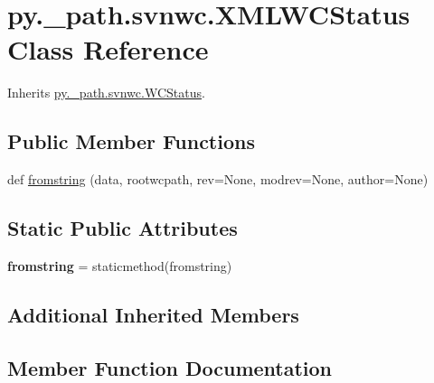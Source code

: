 \hypertarget{classpy_1_1__path_1_1svnwc_1_1_x_m_l_w_c_status}{}\section{py.\+\_\+path.\+svnwc.\+X\+M\+L\+W\+C\+Status Class Reference}
\label{classpy_1_1__path_1_1svnwc_1_1_x_m_l_w_c_status}


Inherits \hyperlink{classpy_1_1__path_1_1svnwc_1_1_w_c_status}{py.\+\_\+path.\+svnwc.\+W\+C\+Status}.

\subsection*{Public Member Functions}
\begin{DoxyCompactItemize}
\item 
def \hyperlink{classpy_1_1__path_1_1svnwc_1_1_x_m_l_w_c_status_a7bfd5c0bf01ae0e4446e55921bf72994}{fromstring} (data, rootwcpath, rev=None, modrev=None, author=None)
\end{DoxyCompactItemize}
\subsection*{Static Public Attributes}
\begin{DoxyCompactItemize}
\item 
\mbox{\label{classpy_1_1__path_1_1svnwc_1_1_x_m_l_w_c_status_a753114ebba073f1a9db8c4c2d3624fff}} 
{\bfseries fromstring} = staticmethod(fromstring)
\end{DoxyCompactItemize}
\subsection*{Additional Inherited Members}


\subsection{Member Function Documentation}
\mbox{\label{classpy_1_1__path_1_1svnwc_1_1_x_m_l_w_c_status_a7bfd5c0bf01ae0e4446e55921bf72994}} 
